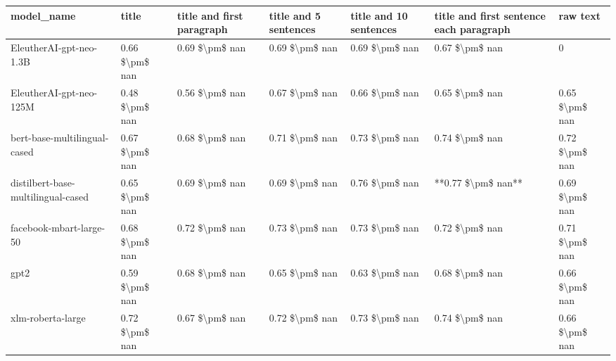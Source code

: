 \begin{tabular}{lllllll}
\toprule
                        model\_name &          title & title and first paragraph & title and 5 sentences & title and 10 sentences & title and first sentence each paragraph &       raw text \\
\midrule
           EleutherAI-gpt-neo-1.3B & 0.66 \$\textbackslash pm\$ nan &            0.69 \$\textbackslash pm\$ nan &        0.69 \$\textbackslash pm\$ nan &         0.69 \$\textbackslash pm\$ nan &                          0.67 \$\textbackslash pm\$ nan &              0 \\
           EleutherAI-gpt-neo-125M & 0.48 \$\textbackslash pm\$ nan &            0.56 \$\textbackslash pm\$ nan &        0.67 \$\textbackslash pm\$ nan &         0.66 \$\textbackslash pm\$ nan &                          0.65 \$\textbackslash pm\$ nan & 0.65 \$\textbackslash pm\$ nan \\
      bert-base-multilingual-cased & 0.67 \$\textbackslash pm\$ nan &            0.68 \$\textbackslash pm\$ nan &        0.71 \$\textbackslash pm\$ nan &         0.73 \$\textbackslash pm\$ nan &                          0.74 \$\textbackslash pm\$ nan & 0.72 \$\textbackslash pm\$ nan \\
distilbert-base-multilingual-cased & 0.65 \$\textbackslash pm\$ nan &            0.69 \$\textbackslash pm\$ nan &        0.69 \$\textbackslash pm\$ nan &         0.76 \$\textbackslash pm\$ nan &                      **0.77 \$\textbackslash pm\$ nan** & 0.69 \$\textbackslash pm\$ nan \\
           facebook-mbart-large-50 & 0.68 \$\textbackslash pm\$ nan &            0.72 \$\textbackslash pm\$ nan &        0.73 \$\textbackslash pm\$ nan &         0.73 \$\textbackslash pm\$ nan &                          0.72 \$\textbackslash pm\$ nan & 0.71 \$\textbackslash pm\$ nan \\
                              gpt2 & 0.59 \$\textbackslash pm\$ nan &            0.68 \$\textbackslash pm\$ nan &        0.65 \$\textbackslash pm\$ nan &         0.63 \$\textbackslash pm\$ nan &                          0.68 \$\textbackslash pm\$ nan & 0.66 \$\textbackslash pm\$ nan \\
                 xlm-roberta-large & 0.72 \$\textbackslash pm\$ nan &            0.67 \$\textbackslash pm\$ nan &        0.72 \$\textbackslash pm\$ nan &         0.73 \$\textbackslash pm\$ nan &                          0.74 \$\textbackslash pm\$ nan & 0.66 \$\textbackslash pm\$ nan \\
\bottomrule
\end{tabular}
